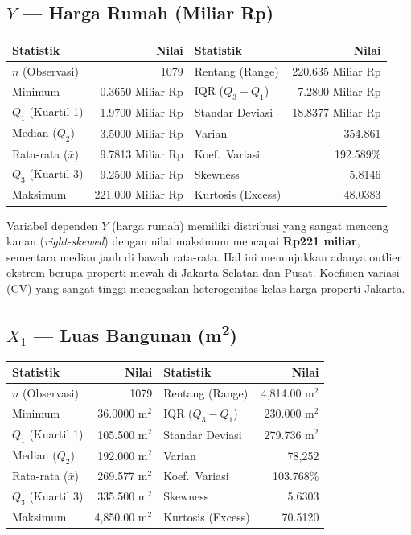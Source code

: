 \documentclass[12pt,a4paper]{article}
\begin{document}
\subsection{\texorpdfstring{$Y$}{Y} --- Harga Rumah (Miliar Rp)}
\begin{center}
\begin{tabular}{|l|r||l|r|}
\hline
\textbf{Statistik} & \textbf{Nilai} & \textbf{Statistik} & \textbf{Nilai} \\
\hline
$n$ (Observasi) & 1079 & Rentang (Range) & 220.635 Miliar Rp \\
Minimum & 0.3650 Miliar Rp & IQR ($Q_3 - Q_1$) & 7.2800 Miliar Rp \\
$Q_1$ (Kuartil 1) & 1.9700 Miliar Rp & Standar Deviasi & 18.8377 Miliar Rp \\
Median ($Q_2$) & 3.5000 Miliar Rp & Varian & 354.861 \\
Rata-rata ($\bar{x}$) & 9.7813 Miliar Rp & Koef.~Variasi & 192.589\% \\
$Q_3$ (Kuartil 3) & 9.2500 Miliar Rp & Skewness & 5.8146 \\
Maksimum & 221.000 Miliar Rp & Kurtosis (Excess) & 48.0383 \\
\hline
\end{tabular}
\end{center}

\noindent Variabel dependen $Y$ (harga rumah) memiliki distribusi yang sangat menceng kanan (\textit{right-skewed}) dengan nilai maksimum mencapai \textbf{Rp221 miliar}, sementara median jauh di bawah rata-rata. Hal ini menunjukkan adanya outlier ekstrem berupa properti mewah di Jakarta Selatan dan Pusat. Koefisien variasi (CV) yang sangat tinggi menegaskan heterogenitas kelas harga properti Jakarta.


\subsection{\texorpdfstring{$X_1$ --- Luas Bangunan (m\textsuperscript{2})}{X1 --- Luas Bangunan (m2)}}
\begin{center}
\begin{tabular}{|l|r||l|r|}
\hline
\textbf{Statistik} & \textbf{Nilai} & \textbf{Statistik} & \textbf{Nilai} \\
\hline
$n$ (Observasi) & 1079 & Rentang (Range) & 4,814.00 m$^2$ \\
Minimum & 36.0000 m$^2$ & IQR ($Q_3 - Q_1$) & 230.000 m$^2$ \\
$Q_1$ (Kuartil 1) & 105.500 m$^2$ & Standar Deviasi & 279.736 m$^2$ \\
Median ($Q_2$) & 192.000 m$^2$ & Varian & 78,252 \\
Rata-rata ($\bar{x}$) & 269.577 m$^2$ & Koef.~Variasi & 103.768\% \\
$Q_3$ (Kuartil 3) & 335.500 m$^2$ & Skewness & 5.6303 \\
Maksimum & 4,850.00 m$^2$ & Kurtosis (Excess) & 70.5120 \\
\hline
\end{tabular}
\end{center}
\end{document}
